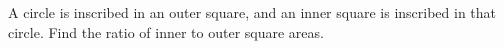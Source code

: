 A circle is inscribed in an outer square, and an inner square is inscribed in that circle. Find the ratio of inner to outer square areas.
